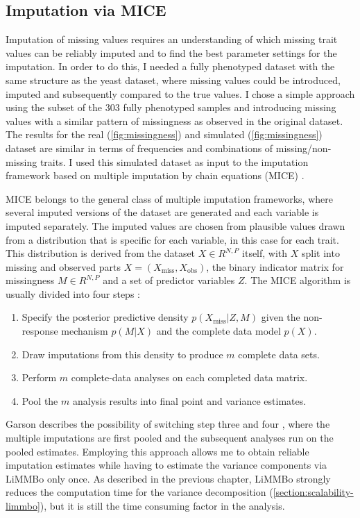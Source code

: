 \subsection{Imputation via MICE} 
Imputation of missing values requires an understanding of which missing trait values can be reliably imputed and to find the best parameter settings for the imputation. In order to do this, I needed a fully phenotyped dataset with the same structure as the yeast dataset, where missing values could be introduced, imputed and subsequently compared to the true values. I chose a simple approach using the subset of the \num{303} fully phenotyped samples and introducing missing values with a similar pattern of missingness as observed in the original dataset. The results for the real (\cref{fig:missingness}) and simulated (\cref{fig:missingness}) dataset are similar in terms of frequencies and combinations of missing/non-missing traits. I used this simulated dataset as input to the imputation framework based on multiple imputation by chain equations (MICE) \citep{vanBuuren2011}. 

MICE belongs to the general class of multiple imputation frameworks, where several imputed versions of the dataset are generated and each variable is imputed separately. The imputed values are chosen from plausible values drawn from a distribution that is specific for each variable, in this case for each trait. This distribution is derived from the dataset \(X \in R^{N,P}\) itself,  with \(X\) split into missing and observed parts \(X = (X_\text{miss}, X_\text{obs})\), the binary indicator matrix for missingness \(M \in R^{N,P}\) and a set of predictor variables \(Z\). The MICE algorithm is usually divided into four steps \citep{Rubin1987,vanBuuren1999,Pigott2001}:
\begin{enumerate}
\item Specify the posterior predictive density \(p(X_\text{miss} | Z, M)\) given the non-response mechanism  \(p(M | X)\)  and the complete data model  \(p(X)\).
\item Draw imputations from this density to produce \(m\) complete data sets. 
\item Perform \(m\) complete-data analyses on each completed data matrix. 
\item Pool the \(m\) analysis results into final point and variance estimates.
\end{enumerate}
Garson describes the possibility of switching step three and four \citeyear{Garson2015}, where the multiple imputations are first pooled and the subsequent analyses run on the pooled estimates. Employing this approach allows me to  obtain reliable imputation estimates while having to estimate the variance components via LiMMBo only once. As described in the previous chapter, LiMMBo strongly reduces the computation time for the variance decomposition (\cref{section:scalability-limmbo}), but it is still the time consuming factor in the analysis. 

